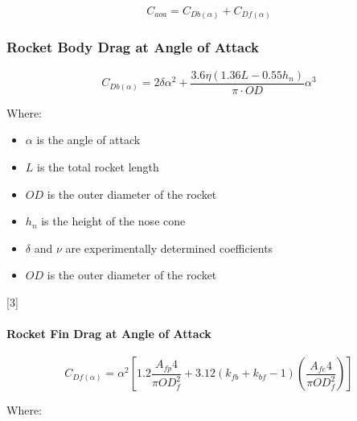 \documentclass[]{article}
\providecommand{\tightlist}{%
  \setlength{\itemsep}{0pt}\setlength{\parskip}{0pt}}
\let\oldparagraph\paragraph
\renewcommand{\paragraph}[1]{\oldparagraph{#1}\mbox{}}
\begin{document}
\begin{equation}
\label{eq_rocket_drag_aoa}
C_{aoa} = C_{Db(\alpha)} + C_{Df(\alpha)}
\end{equation}

\subsubsection{Rocket Body Drag at Angle of
Attack}\label{rocket-body-drag-at-angle-of-attack}

\begin{equation}
\label{eq_rocket_body_drag_aoa}
C_{Db(\alpha)} = 2 \delta \alpha^2 + \dfrac{3.6 \eta (1.36 L - 0.55 h_n ) }{ \pi \cdot OD } \alpha^3
\end{equation}

Where:

\begin{itemize}
\tightlist
\item
  \(\alpha\) is the angle of attack
\item
  \(L\) is the total rocket length
\item
  \(OD\) is the outer diameter of the rocket
\item
  \(h_n\) is the height of the nose cone
\item
  \(\delta\) and \(\nu\) are experimentally determined coefficients
\item
  \(OD\) is the outer diameter of the rocket
\end{itemize}

{[}3{]}

\paragraph{Rocket Fin Drag at Angle of
Attack}\label{rocket-fin-drag-at-angle-of-attack}

\begin{equation}
\label{eq_rocket_fin_drag_aoa}
C_{Df(\alpha)} = \alpha^2 \left[ 1.2 \dfrac{A_{fp}4}{\pi OD^2_f} + 3.12 (k_{fb} + k_{bf} - 1) \left( \dfrac{A_{fe} 4}{\pi OD^2_f} \right) \right]
\end{equation}

Where:
\end{document}
